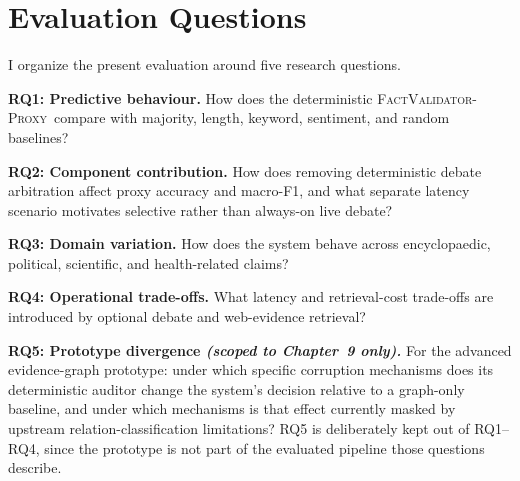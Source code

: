 \documentclass[12pt,a4paper,openany]{report}
\newcommand{\proxy}{\textsc{FactValidator-Proxy}}
\begin{document}
\section{Evaluation Questions}
I organize the present evaluation around five research questions.

\textbf{RQ1: Predictive behaviour.} How does the deterministic \proxy\ compare with majority, length, keyword, sentiment, and random baselines?

\textbf{RQ2: Component contribution.} How does removing deterministic debate arbitration affect proxy accuracy and macro-F1, and what separate latency scenario motivates selective rather than always-on live debate?

\textbf{RQ3: Domain variation.} How does the system behave across encyclopaedic, political, scientific, and health-related claims?

\textbf{RQ4: Operational trade-offs.} What latency and retrieval-cost trade-offs are introduced by optional debate and web-evidence retrieval?

\textbf{RQ5: Prototype divergence \emph{(scoped to Chapter~9 only).}} For the advanced evidence-graph prototype: under which specific corruption mechanisms does its deterministic auditor change the system's decision relative to a graph-only baseline, and under which mechanisms is that effect currently masked by upstream relation-classification limitations? RQ5 is deliberately kept out of RQ1--RQ4, since the prototype is not part of the evaluated pipeline those questions describe.
\end{document}

